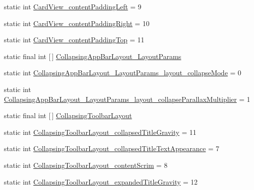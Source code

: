 \begin{DoxyCompactItemize}
\item 
static int \hyperlink{classandroid_1_1support_1_1v7_1_1mediarouter_1_1R_1_1styleable_aa88f6ec6b491928155b54b29bdd4a834}{Card\+View\+\_\+content\+Padding\+Left} = 9
\item 
static int \hyperlink{classandroid_1_1support_1_1v7_1_1mediarouter_1_1R_1_1styleable_adda6aa23539f7df612d220bb2a3f95b6}{Card\+View\+\_\+content\+Padding\+Right} = 10
\item 
static int \hyperlink{classandroid_1_1support_1_1v7_1_1mediarouter_1_1R_1_1styleable_a408aeb6a61417fdcead372dc44eb7d99}{Card\+View\+\_\+content\+Padding\+Top} = 11
\item 
static final int \mbox{[}$\,$\mbox{]} \hyperlink{classandroid_1_1support_1_1v7_1_1mediarouter_1_1R_1_1styleable_a3a8fc0e8f0991d8f2645deeb9a8cfbb6}{Collapsing\+App\+Bar\+Layout\+\_\+\+Layout\+Params}
\item 
static int \hyperlink{classandroid_1_1support_1_1v7_1_1mediarouter_1_1R_1_1styleable_a3e5fbc3ee8d75862d538595291dd486d}{Collapsing\+App\+Bar\+Layout\+\_\+\+Layout\+Params\+\_\+layout\+\_\+collapse\+Mode} = 0
\item 
static int \hyperlink{classandroid_1_1support_1_1v7_1_1mediarouter_1_1R_1_1styleable_a19d2f8a3ce6aef7ab8239ffeffe31018}{Collapsing\+App\+Bar\+Layout\+\_\+\+Layout\+Params\+\_\+layout\+\_\+collapse\+Parallax\+Multiplier} = 1
\item 
static final int \mbox{[}$\,$\mbox{]} \hyperlink{classandroid_1_1support_1_1v7_1_1mediarouter_1_1R_1_1styleable_aae2cb4975e9b9a19d129888f497cc386}{Collapsing\+Toolbar\+Layout}
\item 
static int \hyperlink{classandroid_1_1support_1_1v7_1_1mediarouter_1_1R_1_1styleable_a4796c2b434065ed0a5d8b8da7097611f}{Collapsing\+Toolbar\+Layout\+\_\+collapsed\+Title\+Gravity} = 11
\item 
static int \hyperlink{classandroid_1_1support_1_1v7_1_1mediarouter_1_1R_1_1styleable_a19289097d1a4df77e8a7e6951eca7f63}{Collapsing\+Toolbar\+Layout\+\_\+collapsed\+Title\+Text\+Appearance} = 7
\item 
static int \hyperlink{classandroid_1_1support_1_1v7_1_1mediarouter_1_1R_1_1styleable_a733f927a6b32c7e392024dee4d4567eb}{Collapsing\+Toolbar\+Layout\+\_\+content\+Scrim} = 8
\item 
static int \hyperlink{classandroid_1_1support_1_1v7_1_1mediarouter_1_1R_1_1styleable_ae40ceb21ca3985d085331f3239b64f89}{Collapsing\+Toolbar\+Layout\+\_\+expanded\+Title\+Gravity} = 12
\item 

\end{DoxyCompactItemize}
